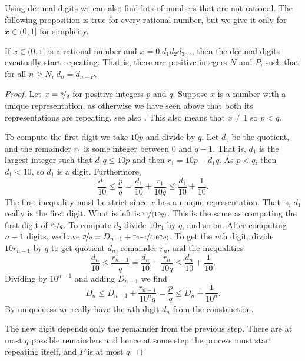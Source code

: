 Using decimal digits we can also find lots of numbers that are not rational.
The following proposition is true for every
rational number, but we give it only for $x \in (0,1]$ for simplicity.

\begin{prop} \label{prop:rationaldecimal}
If $x \in (0,1]$ is a rational number and $x = 0.d_1d_2d_3\ldots$,
then the decimal digits eventually start repeating.  That is, there are 
positive integers $N$ and $P$, such that for all $n \geq N$, $d_n = d_{n+P}$.
\end{prop}

\begin{proof}
Let $x = \nicefrac{p}{q}$ for positive integers $p$ and $q$.
Suppose $x$ is a number with a unique representation, as
otherwise we have seen above that both its representations are repeating,
see also .  This also means
that $x \not= 1$ so $p < q$.

To compute the first digit we take $10 p$ and divide by
$q$.  Let $d_1$ be the quotient, and the remainder $r_1$ is some integer
between 0 and $q-1$.  That is, $d_1$ is the largest integer
such that $d_1 q \leq 10p$ and then $r_1 = 10p - d_1q$.
As $p < q$, then $d_1 < 10$, so $d_1$ is a digit.
Furthermore,
\begin{equation*}
\frac{d_1}{10} \leq \frac{p}{q} =
\frac{d_1}{10} + \frac{r_1}{10q} \leq \frac{d_1}{10} +
\frac{1}{10} .
\end{equation*}
The first inequality must be strict since $x$ has a
unique representation.  That is, $d_1$ really is the first digit.
What is left is $\nicefrac{r_1}{(10q)}$.  This is the same as computing the
first digit of $\nicefrac{r_1}{q}$.
To compute $d_2$ divide $10 r_1$ by $q$, and so on.
After computing $n-1$ digits, we have
$\nicefrac{p}{q} = D_{n-1} + \nicefrac{r_{n-1}}{(10^{n} q)}$.
To get the $n$th digit,
divide $10 r_{n-1}$ by $q$
to get quotient $d_n$, remainder $r_n$, and the inequalities
\begin{equation*}
\frac{d_n}{10} \leq \frac{r_{n-1}}{q} =
\frac{d_n}{10} + \frac{r_n}{10q} \leq \frac{d_n}{10} +
\frac{1}{10} .
\end{equation*}
Dividing by $10^{n-1}$ and adding $D_{n-1}$ we find
\begin{equation*}
D_n \leq D_{n-1} + \frac{r_{n-1}}{10^{n} q} = \frac{p}{q} \leq D_n +
\frac{1}{10^n} .
\end{equation*}
By uniqueness we really have 
the $n$th digit $d_n$ from the construction.

The new digit depends only the remainder from the previous
step.  There
are at most $q$ possible remainders
and hence at some step the process must start repeating itself,
and $P$ is at most $q$.
\end{proof}

